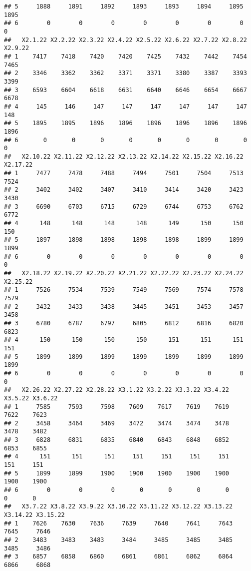 \documentclass[
]{article}
\begin{document}
\begin{verbatim}
## 5     1888     1891     1892     1893     1893     1894     1895     1895
## 6        0        0        0        0        0        0        0        0
##   X2.1.22 X2.2.22 X2.3.22 X2.4.22 X2.5.22 X2.6.22 X2.7.22 X2.8.22 X2.9.22
## 1    7417    7418    7420    7420    7425    7432    7442    7454    7465
## 2    3346    3362    3362    3371    3371    3380    3387    3393    3399
## 3    6593    6604    6618    6631    6640    6646    6654    6667    6678
## 4     145     146     147     147     147     147     147     147     148
## 5    1895    1895    1896    1896    1896    1896    1896    1896    1896
## 6       0       0       0       0       0       0       0       0       0
##   X2.10.22 X2.11.22 X2.12.22 X2.13.22 X2.14.22 X2.15.22 X2.16.22 X2.17.22
## 1     7477     7478     7488     7494     7501     7504     7513     7524
## 2     3402     3402     3407     3410     3414     3420     3423     3430
## 3     6690     6703     6715     6729     6744     6753     6762     6772
## 4      148      148      148      148      149      150      150      150
## 5     1897     1898     1898     1898     1898     1899     1899     1899
## 6        0        0        0        0        0        0        0        0
##   X2.18.22 X2.19.22 X2.20.22 X2.21.22 X2.22.22 X2.23.22 X2.24.22 X2.25.22
## 1     7526     7534     7539     7549     7569     7574     7578     7579
## 2     3432     3433     3438     3445     3451     3453     3457     3458
## 3     6780     6787     6797     6805     6812     6816     6820     6823
## 4      150      150      150      150      151      151      151      151
## 5     1899     1899     1899     1899     1899     1899     1899     1899
## 6        0        0        0        0        0        0        0        0
##   X2.26.22 X2.27.22 X2.28.22 X3.1.22 X3.2.22 X3.3.22 X3.4.22 X3.5.22 X3.6.22
## 1     7585     7593     7598    7609    7617    7619    7619    7622    7623
## 2     3458     3464     3469    3472    3474    3474    3478    3478    3482
## 3     6828     6831     6835    6840    6843    6848    6852    6853    6855
## 4      151      151      151     151     151     151     151     151     151
## 5     1899     1899     1900    1900    1900    1900    1900    1900    1900
## 6        0        0        0       0       0       0       0       0       0
##   X3.7.22 X3.8.22 X3.9.22 X3.10.22 X3.11.22 X3.12.22 X3.13.22 X3.14.22 X3.15.22
## 1    7626    7630    7636     7639     7640     7641     7643     7645     7646
## 2    3483    3483    3483     3484     3485     3485     3485     3485     3486
## 3    6857    6858    6860     6861     6861     6862     6864     6866     6868

\end{verbatim}
\end{document}
